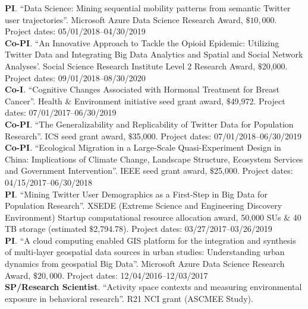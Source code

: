 \documentclass[11pt, a4paper]{article}
\begin{document}
\textbf{PI}. ``Data Science: Mining sequential mobility patterns from semantic Twitter user trajectories''. Microsoft Azure Data Science Research Award, $\$10,000$. Project dates: 05/01/2018--04/30/2019\\
\textbf{Co-PI}. ``An Innovative Approach to Tackle the Opioid Epidemic: Utilizing Twitter Data and Integrating Big Data Analytics and Spatial and Social Network Analyses'. Social Science Research Institute Level 2 Research Award, $\$$20,000. Project dates: 09/01/2018--08/30/2020\\
\textbf{Co-I}. ``Cognitive Changes Associated with Hormonal Treatment for Breast Cancer''. Health $\&$ Environment initiative seed grant award, $\$$49,972. Project dates: 07/01/2017--06/30/2019\\
\textbf{Co-PI}. ``The Generalizability and Replicability of Twitter Data for Population Research''. ICS seed grant award, $\$$35,000. Project dates: 07/01/2018--06/30/2019\\
\textbf{Co-PI}. ``Ecological Migration in a Large-Scale Quasi-Experiment Design in China: Implications of Climate Change, Landscape Structure, Ecosystem Services and Government Intervention''. IEEE seed grant award, $\$$25,000. Project dates: 04/15/2017--06/30/2018\\
\textbf{PI}. ``Mining Twitter User Demographics as a First-Step in Big Data for Population Research''. XSEDE (Extreme Science and Engineering Discovery Environment) Startup computational resource allocation award, 50,000 SUs $\&$ 40 TB storage (estimated $\$$2,794.78). Project dates: 03/27/2017--03/26/2019\\
\textbf{PI}. ``A cloud computing enabled GIS platform for the integration and synthesis of multi-layer geospatial data sources in urban studies: Understanding urban dynamics from geospatial Big Data''. Microsoft Azure Data Science Research Award, $\$20,000$. Project dates: 12/04/2016--12/03/2017\\
\textbf{SP/Research Scientist}. ``Activity space contexts and measuring environmental exposure in behavioral research''. R21 NCI grant (ASCMEE Study).
\end{document}
